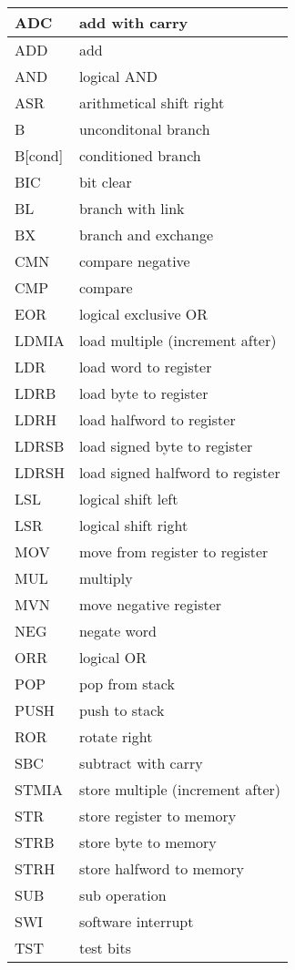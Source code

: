 \begin{longtable}{|l|l|}
\hline
ADC & add with carry \\
\hline
ADD & add \\
\hline
AND & logical AND \\
\hline
ASR & arithmetical shift right \\
\hline
B & unconditonal branch \\
\hline
B[cond] & conditioned branch \\
\hline
BIC & bit clear \\
\hline
BL & branch with link \\
\hline
BX & branch and exchange \\
\hline
CMN & compare negative \\
\hline
CMP & compare \\
\hline
EOR & logical exclusive OR \\
\hline
LDMIA & load multiple (increment after) \\
\hline
LDR & load word to register \\
\hline
LDRB & load byte to register \\
\hline
LDRH & load halfword to register \\
\hline
LDRSB & load signed byte to register \\
\hline
LDRSH & load signed halfword to register \\
\hline
LSL & logical shift left \\
\hline
LSR & logical shift right \\
\hline
MOV & move from register to register \\
\hline
MUL & multiply \\
\hline
MVN & move negative register \\
\hline
NEG & negate word \\
\hline
ORR & logical OR \\
\hline
POP & pop from stack \\
\hline
PUSH & push to stack \\
\hline
ROR & rotate right \\
\hline
SBC & subtract with carry \\
\hline
STMIA & store multiple (increment after) \\
\hline
STR & store register to memory \\
\hline
STRB & store byte to memory \\
\hline
STRH & store halfword to memory \\
\hline
SUB & sub operation \\
\hline
SWI & software interrupt \\
\hline
TST & test bits \\
\hline
\end{longtable}

